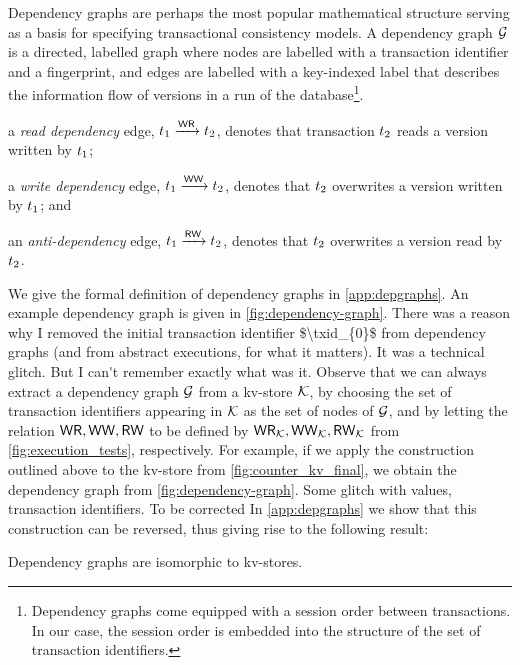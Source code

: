 Dependency graphs \cite{adya-icde,adya} are perhaps the most popular 
mathematical structure serving as a basis for specifying transactional consistency models. 
A dependency graph $\mathcal{G}$ is a directed, labelled graph where
nodes are
labelled with a transaction identifier and a fingerprint, and edges are labelled with a 
key-indexed label that describes the information flow of versions in a run of the database\footnote{Dependency graphs 
come equipped with a session order between transactions. In our case, the session order is embedded into the structure 
of the set of transaction identifiers.}. 
\begin{enumerate*}
	\item a \emph{read dependency} edge, $t_1 \xrightarrow{\mathsf{WR}} t_2$, denotes
that transaction $t_2$ reads a version written by $t_1$;
	\item a \emph{write dependency} edge, $t_1 \xrightarrow{\mathsf{WW}} t_2$, denotes that $t_2$ overwrites a version written by $t_1$; and 
	\item an \emph{anti-dependency} edge, $t_1 \xrightarrow{\mathsf{RW}} t_2$, denotes that $t_2$ overwrites a version read by $t_2$. 
\end{enumerate*}
We give the formal definition of dependency graphs in \cref{app:depgraphs}.
An example dependency graph is given in \cref{fig:dependency-graph}. 
\ac{There was a reason why I removed the initial transaction identifier $\txid_{0}$ 
from dependency graphs (and from abstract executions, for what it matters). It was 
a technical glitch. But I can't remember exactly what was it.}
Observe that we can always extract a dependency graph  $\mathcal{G}$ from a kv-store $\mathcal{K}$, by choosing 
the set of transaction identifiers appearing in $\mathcal{K}$ as the set of nodes of $\mathcal{G}$, and by letting the relation $\mathsf{WR}, \mathsf{WW}, \mathsf{RW}$ to be defined by $\mathsf{WR}_{\mathcal{K}}, \mathsf{WW}_{\mathcal{K}}, \mathsf{RW}_{\mathcal{K}}$ from \cref{fig:execution_tests}, 
respectively. For example, if we apply the construction outlined above to the kv-store 
from \cref{fig:counter_kv_final}, we obtain the dependency graph from \cref{fig:dependency-graph}. 
\ac{Some glitch with values, transaction identifiers. To be corrected} 
In \cref{app:depgraphs} we show that this construction can be reversed, thus giving 
rise to the following result: 
\begin{theorem}
\label{thm:kv_graph_isomorph}
Dependency graphs are isomorphic to kv-stores.
\end{theorem}

